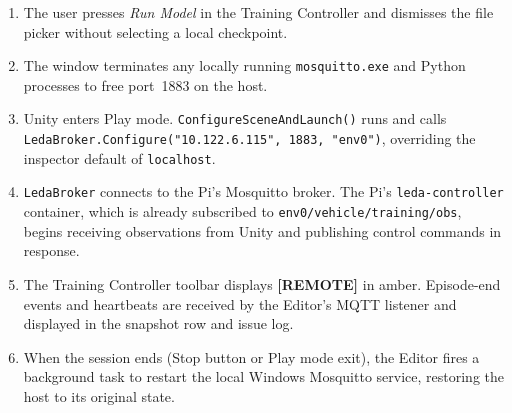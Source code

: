 \begin{enumerate}[leftmargin=2cm,topsep=1.15pt,itemsep=1.15pt,partopsep=1.15pt,parsep=1.15pt]
  \item The user presses \textit{Run Model} in the Training Controller
    and dismisses the file picker without selecting a local checkpoint.
  \item The window terminates any locally running \texttt{mosquitto.exe}
    and Python processes to free port~1883 on the host.
  \item Unity enters Play mode. \texttt{ConfigureSceneAndLaunch()} runs
    and calls \texttt{LedaBroker.Configure("10.122.6.115", 1883, "env0")},
    overriding the inspector default of \texttt{localhost}.
  \item \texttt{LedaBroker} connects to the Pi's Mosquitto broker.
    The Pi's \texttt{leda-controller} container, which is already
    subscribed to \texttt{env0/vehicle/training/obs}, begins receiving
    observations from Unity and publishing control commands in response.
  \item The Training Controller toolbar displays \textbf{[REMOTE]} in
    amber. Episode-end events and heartbeats are received by the Editor's
    MQTT listener and displayed in the snapshot row and issue log.
  \item When the session ends (Stop button or Play mode exit), the
    Editor fires a background task to restart the local Windows Mosquitto
    service, restoring the host to its original state.
\end{enumerate}
